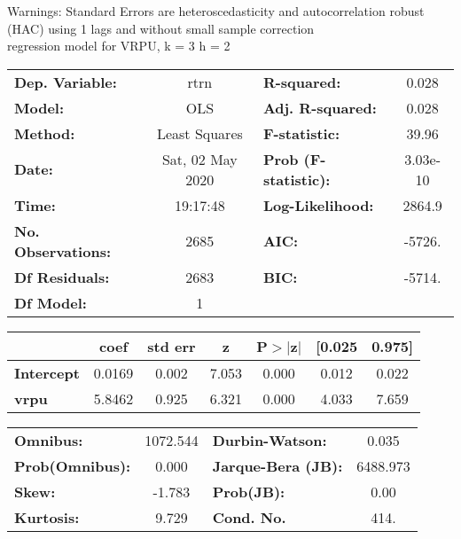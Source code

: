 Warnings: \newline
 [1] Standard Errors are heteroscedasticity and autocorrelation robust (HAC) using 1 lags and without small sample correction\\ 

regression model for VRPU, k = 3 h = 2\begin{center}
\begin{tabular}{lclc}
\toprule
\textbf{Dep. Variable:}    &       rtrn       & \textbf{  R-squared:         } &     0.028   \\
\textbf{Model:}            &       OLS        & \textbf{  Adj. R-squared:    } &     0.028   \\
\textbf{Method:}           &  Least Squares   & \textbf{  F-statistic:       } &     39.96   \\
\textbf{Date:}             & Sat, 02 May 2020 & \textbf{  Prob (F-statistic):} &  3.03e-10   \\
\textbf{Time:}             &     19:17:48     & \textbf{  Log-Likelihood:    } &    2864.9   \\
\textbf{No. Observations:} &        2685      & \textbf{  AIC:               } &    -5726.   \\
\textbf{Df Residuals:}     &        2683      & \textbf{  BIC:               } &    -5714.   \\
\textbf{Df Model:}         &           1      & \textbf{                     } &             \\
\bottomrule
\end{tabular}
\begin{tabular}{lcccccc}
                   & \textbf{coef} & \textbf{std err} & \textbf{z} & \textbf{P$> |$z$|$} & \textbf{[0.025} & \textbf{0.975]}  \\
\midrule
\textbf{Intercept} &       0.0169  &        0.002     &     7.053  &         0.000        &        0.012    &        0.022     \\
\textbf{vrpu}      &       5.8462  &        0.925     &     6.321  &         0.000        &        4.033    &        7.659     \\
\bottomrule
\end{tabular}
\begin{tabular}{lclc}
\textbf{Omnibus:}       & 1072.544 & \textbf{  Durbin-Watson:     } &    0.035  \\
\textbf{Prob(Omnibus):} &   0.000  & \textbf{  Jarque-Bera (JB):  } & 6488.973  \\
\textbf{Skew:}          &  -1.783  & \textbf{  Prob(JB):          } &     0.00  \\
\textbf{Kurtosis:}      &   9.729  & \textbf{  Cond. No.          } &     414.  \\
\bottomrule
\end{tabular}
\end{center}

